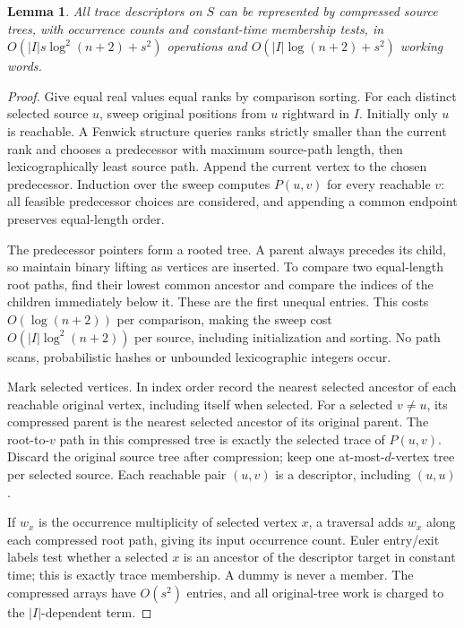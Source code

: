 \documentclass[acmsmall,11pt,nonacm,natbib=false]{acmart}
\newtheorem{lemma}[theorem]{Lemma}
\begin{document}
\begin{lemma}\label{lem:oracle}
All trace descriptors on $S$ can be represented by compressed source trees,
with occurrence counts and constant-time membership tests, in
$O(|I|s\log^2(n+2)+s^2)$ operations and
$O(|I|\log(n+2)+s^2)$ working words.
\end{lemma}
\begin{proof}
Give equal real values equal ranks by comparison sorting. For each distinct
selected source $u$, sweep original positions from $u$ rightward in $I$.
Initially only $u$ is reachable. A Fenwick structure queries ranks strictly
smaller than the current rank and chooses a predecessor with maximum
source-path length, then lexicographically least source path. Append the
current vertex to the chosen predecessor. Induction over the sweep computes
$P(u,v)$ for every reachable $v$: all feasible predecessor choices are
considered, and appending a common endpoint preserves equal-length order.

The predecessor pointers form a rooted tree. A parent always precedes its
child, so maintain binary lifting as vertices are inserted. To compare two
equal-length root paths, find their lowest common ancestor and compare the
indices of the children immediately below it. These are the first unequal
entries. This costs $O(\log(n+2))$ per comparison, making the sweep cost
$O(|I|\log^2(n+2))$ per source, including initialization and sorting. No
path scans, probabilistic hashes or unbounded lexicographic integers occur.

Mark selected vertices. In index order record the nearest selected ancestor
of each reachable original vertex, including itself when selected. For a
selected $v\ne u$, its compressed parent is the nearest selected ancestor
of its original parent. The root-to-$v$ path in this compressed tree is
exactly the selected trace of $P(u,v)$. Discard the original source tree
after compression; keep one at-most-$d$-vertex tree per selected source.
Each reachable pair $(u,v)$ is a descriptor, including $(u,u)$.

If $w_x$ is the occurrence multiplicity of selected vertex $x$, a traversal
adds $w_x$ along each compressed root path, giving its input occurrence
count. Euler entry/exit labels test whether a selected $x$ is an ancestor
of the descriptor target in constant time; this is exactly trace membership.
A dummy is never a member. The compressed arrays have $O(s^2)$ entries,
and all original-tree work is charged to the $|I|$-dependent term.
\end{proof}
\end{document}
